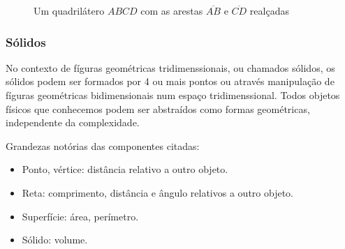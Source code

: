 \begin{multicols*}{2}
    \begin{figure}[H]
        \centering
        \caption{Um quadrilátero $ABCD$ com as arestas $\overline{AB}$ e $\overline{CD}$ realçadas}
    \end{figure}


    \subsubsection*{Sólidos}
    No contexto de fíguras geométricas tridimenssionais, ou chamados sólidos, os sólidos podem ser formados por 4 ou
    mais pontos ou através manipulação de fíguras geométricas bidimensionais num espaço tridimenssional.
    Todos objetos físicos que conhecemos podem ser abstraídos como formas geométricas, independente da complexidade.

    Grandezas notórias das componentes citadas:
    \begin{itemize}
        \setlength\itemsep{1.15pt}
        \item Ponto, vértice: distância relativo a outro objeto.
        \item Reta: comprimento, distância e ângulo relativos a outro objeto.
        \item Superfície: área, perímetro.
        \item Sólido: volume.
    \end{itemize}


\end{multicols*}
